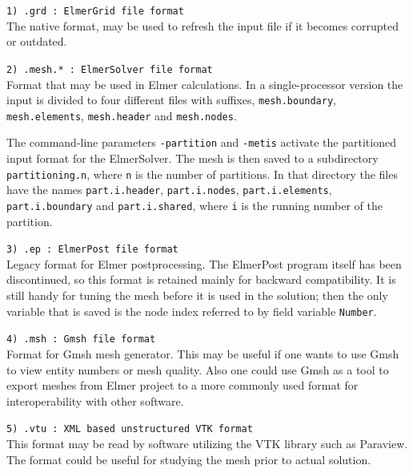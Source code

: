 \begin{description}

\item \texttt{1)  .grd     : ElmerGrid file format} \\
The native format, may be used to refresh the input file if it becomes
corrupted or outdated.

\item \texttt{2)  .mesh.*   : ElmerSolver file format} \\
Format that may be used in Elmer calculations.
In a single-processor version 
the input is divided to four different files with 
suffixes, \texttt{mesh.boundary}, \texttt{mesh.elements},
\texttt{mesh.header} and \texttt{mesh.nodes}.

The command-line parameters \texttt{-partition} and \texttt{-metis} 
activate the partitioned 
input format for the ElmerSolver. 
The mesh is then saved to a subdirectory
\texttt{partitioning.n}, where
\texttt{n} is the number of partitions. In that directory the files
have the names \texttt{part.i.header}, \texttt{part.i.nodes},
\texttt{part.i.elements}, \texttt{part.i.boundary} and
\texttt{part.i.shared}, where \texttt{i} is the running number of the partition.

\item \texttt{3)  .ep       : ElmerPost file format} \\
Legacy format for Elmer postprocessing. The ElmerPost program itself has been
discontinued, so this format is retained mainly for backward compatibility.
It is still handy for tuning the mesh before it is used in the solution; then
the only variable that is saved is the node index referred to by field
variable \texttt{Number}.

\item \texttt{4)  .msh      : Gmsh file format} \\
Format for Gmsh mesh generator. This may be useful if one wants to use Gmsh to view entity numbers or mesh quality. 
Also one could use Gmsh as a tool to export meshes from Elmer project to a more commonly used format for interoperability with other software.

\item \texttt{5)  .vtu      : XML based unstructured VTK format} \\
This format may be read by software utilizing the VTK library such as Paraview. 
The format could be useful for studying the mesh prior to actual solution.



\end{description}



